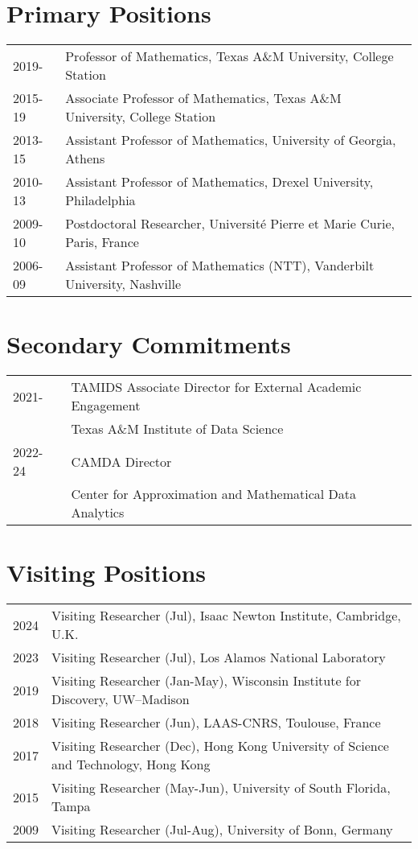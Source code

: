 \documentclass[11pt]{article}
\begin{document}
\section{Primary Positions}
\begin{tabular}{ll}

2019- & Professor of Mathematics, Texas A\&M University, College Station\\
2015-19 & Associate Professor of Mathematics, Texas A\&M University, College Station\\
2013-15 & Assistant Professor of Mathematics, University of Georgia, Athens\\
2010-13 & Assistant Professor of Mathematics,  Drexel University, Philadelphia\\
2009-10 & Postdoctoral Researcher,  Universit\'{e} Pierre et Marie Curie, Paris, France\\
2006-09 & Assistant Professor of Mathematics (NTT),  Vanderbilt University, Nashville
\end{tabular}


\section{Secondary Commitments} %
\begin{tabular}{ll}
2021- \; \, & TAMIDS Associate Director for External Academic Engagement\\
& \quad Texas A\&M Institute of Data Science\\
2022- 24 & CAMDA Director\\
& \quad Center for Approximation and Mathematical Data Analytics
\end{tabular}


\section{Visiting Positions}
\begin{tabular}{ll}
2024 & Visiting Researcher (Jul), Isaac Newton Institute, Cambridge, U.K.\\
2023 & Visiting Researcher (Jul), Los Alamos National Laboratory\\
2019 & Visiting Researcher (Jan-May), Wisconsin Institute for Discovery, UW--Madison\\ 
2018 & Visiting Researcher (Jun), LAAS-CNRS, Toulouse, France\\
2017 & Visiting Researcher (Dec), Hong Kong University of Science and Technology, Hong Kong\\
2015 & Visiting Researcher (May-Jun), University of South Florida, Tampa\\
2009 & Visiting Researcher (Jul-Aug), University of Bonn, Germany
\end{tabular}
 
\end{document}
